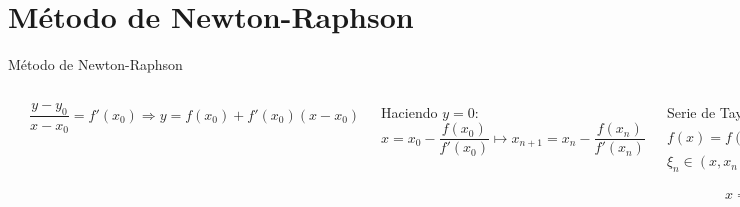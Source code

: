 \documentclass[9pt, aspectratio=169]{beamer}
\begin{document}
\section{Método de Newton-Raphson}

\begin{frame}{Método de Newton-Raphson}
\begin{columns}[c]
\cx
\begin{overprint}
     \includegraphics{figs/newton-01.pdf}
     \includegraphics{figs/newton-02.pdf}
\end{overprint} 

\cx
\[ \frac{y - y_0}{x - x_0} = f'(x_0) \Rightarrow  y = f(x_0) + f'(x_0) (x - x_0) \]

Haciendo $y = 0$:
\[x = x_0 - \frac{f(x_0)}{f'(x_0)} \mapsto  x_{n+1} = x_{n} - \frac{f(x_n)}{f'(x_n)}\]
\pause

\begin{overprint}
 {
Serie de Taylor ($x_n \approx x*$):
\[f(x) = f(x_n) + (x - x_n) f'(x_n) + \frac{1}{2} (x - x_n)^2 f''(\xi) \]
$\xi_n \in (x, x_n)$ Hacemos $f(x) = 0$:
\[ x = x_n - \frac{f(x_n)}{f'(x_n)} - \frac{1}{2} (x - x_n)^2 \frac{f''(\xi_n)}{f'(x_n)} \]
\[ \mapsto x_{n+1} = x_n - \frac{f(x_n)}{f'(x_n)'} \]
}
\end{overprint}
\end{columns}
\end{frame}
\end{document}
